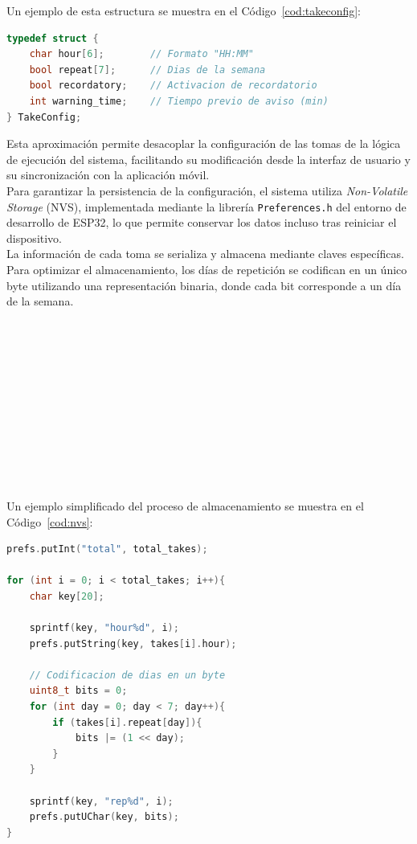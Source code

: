 Un ejemplo de esta estructura se muestra en el Código~\ref{cod:takeconfig}:

\begin{code}[H]
\begin{lstlisting}[language=C++]
typedef struct {
    char hour[6];        // Formato "HH:MM"
    bool repeat[7];      // Dias de la semana
    bool recordatory;    // Activacion de recordatorio
    int warning_time;    // Tiempo previo de aviso (min)
} TakeConfig;
\end{lstlisting}
\caption{Estructura de datos para la configuración de tomas}
\label{cod:takeconfig}
\end{code}

Esta aproximación permite desacoplar la configuración de las tomas de la lógica de ejecución del sistema, facilitando su modificación desde la interfaz de usuario y su sincronización con la aplicación móvil.\\

Para garantizar la persistencia de la configuración, el sistema utiliza \textit{Non-Volatile Storage} (NVS), implementada mediante la librería \texttt{Preferences.h} del entorno de desarrollo de ESP32, lo que permite conservar los datos incluso tras reiniciar el dispositivo.\\

La información de cada toma se serializa y almacena mediante claves específicas. Para optimizar el almacenamiento, los días de repetición se codifican en un único byte utilizando una representación binaria, donde cada bit corresponde a un día de la semana.\\

\

\

\

\

\

\

\

Un ejemplo simplificado del proceso de almacenamiento se muestra en el Código~\ref{cod:nvs}:

\begin{code}[H]
\begin{lstlisting}[language=C++]
prefs.putInt("total", total_takes);

for (int i = 0; i < total_takes; i++){
    char key[20];

    sprintf(key, "hour%d", i);
    prefs.putString(key, takes[i].hour);

    // Codificacion de dias en un byte
    uint8_t bits = 0;
    for (int day = 0; day < 7; day++){
        if (takes[i].repeat[day]){
            bits |= (1 << day);
        }
    }

    sprintf(key, "rep%d", i);
    prefs.putUChar(key, bits);
}
\end{lstlisting}
\caption{Almacenamiento de tomas en memoria no volátil}
\label{cod:nvs}
\end{code}

